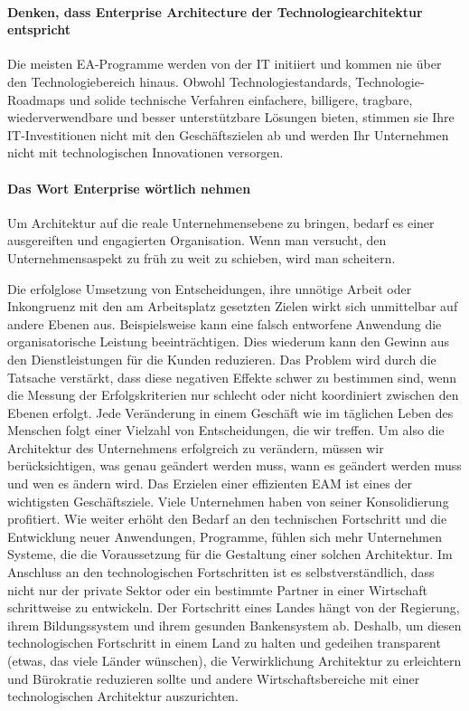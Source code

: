 \documentclass[doc]{apa6}
\begin{document}
\paragraph{Denken, dass Enterprise Architecture der Technologiearchitektur entspricht} Die meisten EA-Programme werden von der IT initiiert und kommen nie über den Technologiebereich hinaus. Obwohl Technologiestandards, Technologie-Roadmaps und solide technische Verfahren einfachere, billigere, tragbare, wiederverwendbare und besser unterstützbare Lösungen bieten, stimmen sie Ihre IT-Investitionen nicht mit den Geschäftszielen ab und werden Ihr Unternehmen nicht mit technologischen Innovationen versorgen.
\paragraph{Das Wort Enterprise wörtlich nehmen} Um Architektur auf die reale Unternehmensebene zu bringen, bedarf es einer ausgereiften und engagierten Organisation. Wenn man versucht, den Unternehmensaspekt zu früh zu weit zu schieben, wird man scheitern.

Die erfolglose Umsetzung von Entscheidungen, ihre unnötige Arbeit oder Inkongruenz mit den am Arbeitsplatz gesetzten Zielen wirkt sich unmittelbar auf andere Ebenen aus. Beispielsweise kann eine falsch entworfene Anwendung die organisatorische Leistung beeinträchtigen. Dies wiederum kann den Gewinn aus den Dienstleistungen für die Kunden reduzieren.
Das Problem wird durch die Tatsache verstärkt, dass diese negativen Effekte schwer zu bestimmen sind, wenn die Messung der Erfolgskriterien nur schlecht oder nicht koordiniert zwischen den Ebenen erfolgt.
Jede Veränderung in einem Geschäft wie im täglichen Leben des Menschen folgt einer Vielzahl von Entscheidungen, die wir treffen.
Um also die Architektur des Unternehmens erfolgreich zu verändern, müssen wir berücksichtigen, was genau geändert werden muss, wann es geändert werden muss und wen es ändern wird.
Das Erzielen einer effizienten EAM ist eines der wichtigsten Geschäftsziele. Viele Unternehmen haben von seiner Konsolidierung profitiert. Wie weiter erhöht den Bedarf an den technischen Fortschritt und die Entwicklung neuer Anwendungen, Programme, fühlen sich mehr Unternehmen Systeme, die die Voraussetzung für die Gestaltung einer solchen Architektur.
Im Anschluss an den technologischen Fortschritten ist es selbstverständlich, dass nicht nur der private Sektor oder ein bestimmte Partner in einer Wirtschaft schrittweise zu entwickeln. Der Fortschritt eines Landes hängt von der Regierung, ihrem Bildungssystem und ihrem gesunden Bankensystem ab.
Deshalb, um diesen technologischen Fortschritt in einem Land zu halten und gedeihen transparent (etwas, das viele Länder wünschen), die Verwirklichung Architektur zu erleichtern und Bürokratie reduzieren sollte und andere Wirtschaftsbereiche mit einer technologischen Architektur auszurichten.
\end{document}
